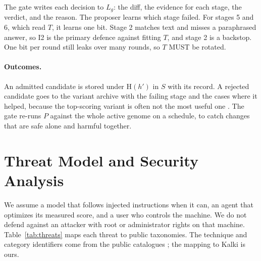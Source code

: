 \documentclass[11pt,a4paper]{article}
\begin{document}
The gate writes each decision to $L_g$: the diff, the evidence for each stage, the verdict, and the reason. The proposer learns which stage failed. For stages 5 and 6, which read $T$, it learns one bit. Stage 2 matches text and misses a paraphrased answer, so I2 is the primary defence against fitting $T$, and stage 2 is a backstop. One bit per round still leaks over many rounds, so $T$ MUST be rotated.

\paragraph{Outcomes.} An admitted candidate is stored under $\mathrm{H}(h')$ in $S$ with its record. A rejected candidate goes to the variant archive with the failing stage and the cases where it helped, because the top-scoring variant is often not the most useful one \citep{wang2026beneath}. The gate re-runs $P$ against the whole active genome on a schedule, to catch changes that are safe alone and harmful together.

\section{Threat Model and Security Analysis}
\label{sec:threat}

We assume a model that follows injected instructions when it can, an agent that optimizes its measured score, and a user who controls the machine. We do not defend against an attacker with root or administrator rights on that machine. Table~\ref{tab:threats} maps each threat to public taxonomies. The technique and category identifiers come from the public catalogues \citep{mitreattack,mitreatlas,owasp2025llm}; the mapping to Kalki is ours.
\end{document}
